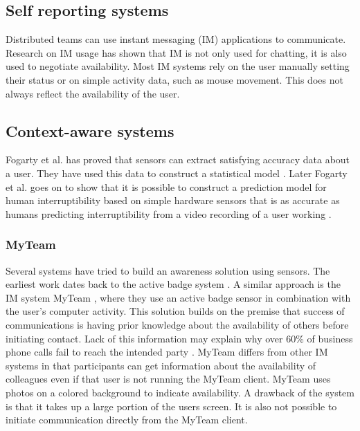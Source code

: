 \documentclass{sigchi}
\begin{document}
\subsection{Self reporting systems}
Distributed teams can use instant messaging (IM) applications to communicate.
Research on IM usage \cite{nardi2000interaction} \cite{handel2002chat} \cite{tang2001connexus} has shown that IM is not only used for chatting, it is also used to negotiate availability.
Most IM systems rely on the user manually setting their status or on simple activity data, such as mouse movement.
This does not always reflect the availability of the user.

\subsection{Context-aware systems}
Fogarty et al. has proved that sensors can extract satisfying accuracy data about a user.
They have used this data to construct a statistical model \cite{fogarty2004examining}.
Later Fogarty et al. goes on to show that it is possible to construct a prediction model for human interruptibility based on simple hardware sensors that is as accurate as humans predicting interruptibility from a video recording of a user working \cite{fogarty2005predicting}.

\subsubsection{MyTeam}
Several systems have tried to build an awareness solution using sensors.
The earliest work dates back to the active badge system \cite{want1992active}.
A similar approach is the IM system MyTeam \cite{lai2003myteam}, where they use an active badge sensor in combination with the  user's computer activity.
This solution builds on the premise that success of communications is having prior knowledge about the availability of others before initiating contact.
Lack of this information may explain why over 60\% of business phone calls fail to reach the intended party \cite{whittaker1995rethinking}.
MyTeam differs from other IM systems in that participants can get information about the availability of colleagues even if that user is not running the MyTeam client.
MyTeam uses photos on a colored background to indicate availability.
A drawback of the system is that it takes up a large portion of the users screen. It is also not possible to initiate communication directly from the MyTeam client.
\end{document}
